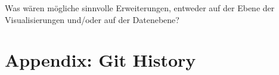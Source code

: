 \documentclass[usegeometry=true]{scrartcl}
\begin{document}
Was wären mögliche sinnvolle Erweiterungen, entweder auf der Ebene der Visualisierungen und/oder auf der Datenebene?

\section*{Appendix: Git History}
% 

\printbibliography
\end{document}
